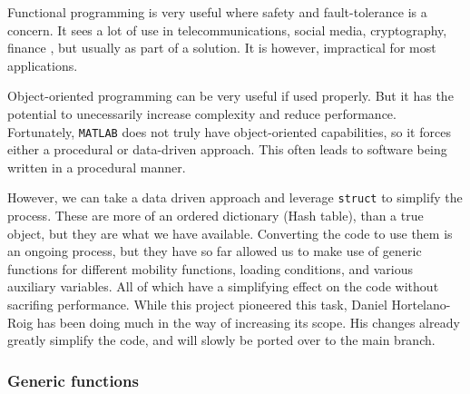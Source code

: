 Functional programming is very useful where safety and fault-tolerance is a concern. It sees a lot of use in telecommunications, social media, cryptography, finance \cite{haskell,functionalProg}, but usually as part of a solution. It is however, impractical for most applications.

Object-oriented programming can be very useful if used properly. But it has the potential to unecessarily increase complexity and reduce performance. Fortunately, \texttt{MATLAB} does not truly have object-oriented capabilities, so it forces either a procedural or data-driven approach. This often leads to software being written in a procedural manner.

However, we can take a data driven approach and leverage \texttt{struct} to simplify the process. These are more of an ordered dictionary (Hash table), than a true object, but they are what we have available. Converting the code to use them is an ongoing process, but they have so far allowed us to make use of generic functions for different mobility functions, loading conditions, and various auxiliary variables. All of which have a simplifying effect on the code without sacrifing performance. While this project pioneered this task, Daniel Hortelano-Roig has been doing much in the way of increasing its scope. His changes already greatly simplify the code, and will slowly be ported over to the main branch.

\subsubsection{Generic functions}

